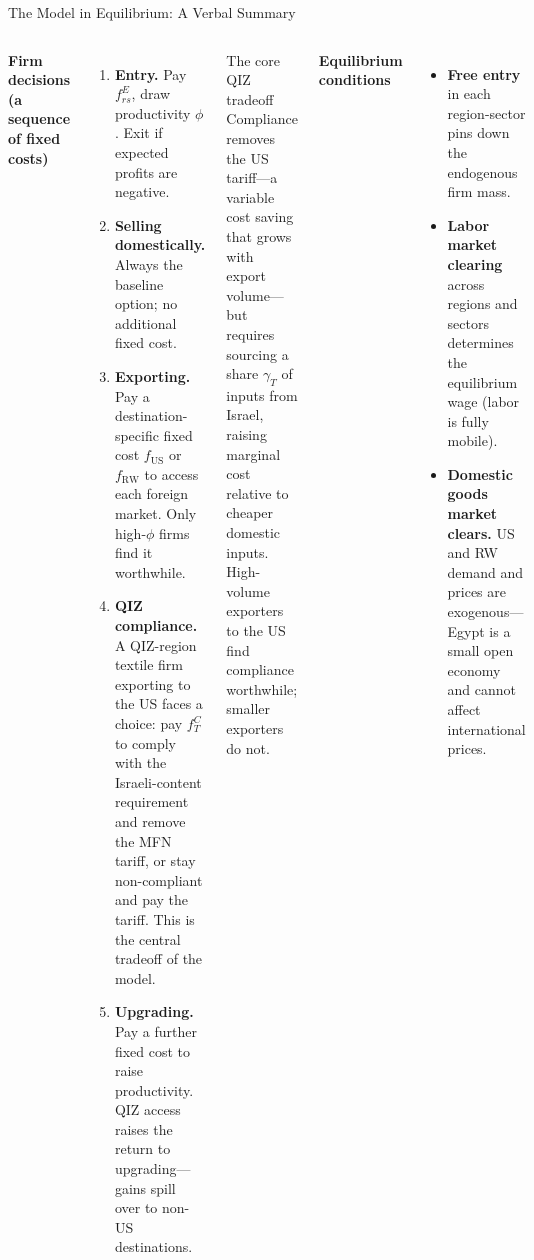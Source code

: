 \documentclass[aspectratio=169,10pt]{beamer}
\begin{document}
\begin{frame}{The Model in Equilibrium: A Verbal Summary}
\small
\begin{columns}[T]
\textbf{Firm decisions (a sequence of fixed costs)}
\begin{enumerate}
  \item \textbf{Entry.} Pay $f^E_{rs}$, draw productivity $\phi$. Exit if expected profits are negative.
  \item \textbf{Selling domestically.} Always the baseline option; no additional fixed cost.
  \item \textbf{Exporting.} Pay a destination-specific fixed cost $f_{\text{US}}$ or $f_{\text{RW}}$ to access each foreign market. Only high-$\phi$ firms find it worthwhile.
  \item \textbf{QIZ compliance.} A QIZ-region textile firm exporting to the US faces a choice: pay $f^C_T$ to comply with the Israeli-content requirement and remove the MFN tariff, or stay non-compliant and pay the tariff. This is the central tradeoff of the model.
  \item \textbf{Upgrading.} Pay a further fixed cost to raise productivity. QIZ access raises the return to upgrading---gains spill over to non-US destinations.
\end{enumerate}

\begin{block}{The core QIZ tradeoff}
Compliance removes the US tariff---a variable cost saving that grows with export volume---but requires sourcing a share $\gamma_T$ of inputs from Israel, raising marginal cost relative to cheaper domestic inputs. High-volume exporters to the US find compliance worthwhile; smaller exporters do not.
\end{block}

\vspace{0.5em}
\textbf{Equilibrium conditions}
\begin{itemize}
  \item \textbf{Free entry} in each region-sector pins down the endogenous firm mass.
  \item \textbf{Labor market clearing} across regions and sectors determines the equilibrium wage (labor is fully mobile).
  \item \textbf{Domestic goods market clears.} US and RW demand and prices are exogenous---Egypt is a small open economy and cannot affect international prices.
\end{itemize}
\end{columns}
\end{frame}
\end{document}
